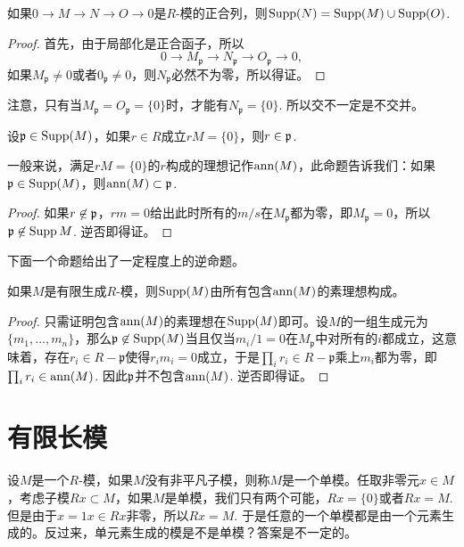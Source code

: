 \begin{lem}
	如果$0\to M\to N\to O\to 0$是$R$-模的正合列，则$\operatorname{Supp}(N)=\operatorname{Supp}(M)\cup \operatorname{Supp}(O)$.
\end{lem}

\begin{proof}
	首先，由于局部化是正合函子，所以
	\[
		0\to M_{\mathfrak p}\to N_{\mathfrak p}\to O_{\mathfrak p}\to 0,
	\]
	如果$M_{\mathfrak p}\neq 0$或者$0_{\mathfrak p}\neq 0$，则$N_{\mathfrak p}$必然不为零，所以得证。
\end{proof}

注意，只有当$M_{\mathfrak p}=O_{\mathfrak p}=\{0\}$时，才能有$N_{\mathfrak p}=\{0\}$. 所以交不一定是不交并。

\begin{lem}
	设$\mathfrak{p}\in \operatorname{Supp}(M)$，如果$r\in R$成立$rM=\{0\}$，则$r\in \mathfrak{p}$.
\end{lem}

一般来说，满足$rM=\{0\}$的$r$构成的理想记作$\operatorname{ann}(M)$，此命题告诉我们：如果$\mathfrak{p}\in\operatorname{Supp}(M)$，则$\operatorname{ann}(M)\subset \mathfrak{p}$.

\begin{proof}
	如果$r\not\in\mathfrak{p}$，$rm=0$给出此时所有的$m/s$在$M_{\mathfrak p}$都为零，即$M_{\mathfrak p}=0$，所以$\mathfrak{p}\not\in \operatorname{Supp} M$. 逆否即得证。
\end{proof}

下面一个命题给出了一定程度上的逆命题。

\begin{lem}\label{lem:3.5.28}
	如果$M$是有限生成$R$-模，则$\operatorname{Supp}(M)$由所有包含$\operatorname{ann}(M)$的素理想构成。
\end{lem}

\begin{proof}
	只需证明包含$\operatorname{ann}(M)$的素理想在$\operatorname{Supp}(M)$即可。设$M$的一组生成元为$\{m_1,\dots,m_n\}$，那么$\mathfrak p\not\in \operatorname{Supp}(M)$当且仅当$m_i/1=0$在$M_{\mathfrak p}$中对所有的$i$都成立，这意味着，存在$r_i\in  R-\mathfrak p$使得$r_im_i=0$成立，于是$\prod_i r_i\in R-\mathfrak p$乘上$m_i$都为零，即$\prod_i r_i\in \operatorname{ann}(M)$. 因此$\mathfrak{p}$并不包含$\operatorname{ann}(M)$. 逆否即得证。
\end{proof} 


\section{有限长模}

\para 设$M$是一个$R$-模，如果$M$没有非平凡子模，则称$M$是一个单模。任取非零元$x\in M$，考虑子模$Rx\subset M$，如果$M$是单模，我们只有两个可能，$Rx=\{0\}$或者$Rx=M$. 但是由于$x=1x\in Rx$非零，所以$Rx=M$. 于是任意的一个单模都是由一个元素生成的。反过来，单元素生成的模是不是单模？答案是不一定的。

